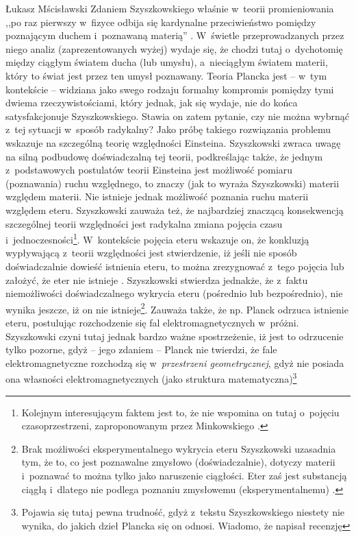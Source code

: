 \begin{artplenv}{Łukasz Mścisławski}
Zdaniem Szyszkowskiego właśnie w~teorii promieniowania ,,po raz pierwszy w~fizyce odbija się kardynalne przeciwieństwo pomiędzy poznającym duchem i~poznawaną materią''
\parencite[][s.~54]{szyszkowski_o_1916}. %
 W~świetle przeprowadzanych przez niego analiz (zaprezentowanych wyżej) wydaje się, że chodzi tutaj o~dychotomię między ciągłym światem ducha (lub umysłu), a~nieciągłym światem materii, który to świat jest przez ten umysł poznawany. Teoria Plancka jest -- w~tym kontekście -- widziana jako swego rodzaju formalny kompromis pomiędzy tymi dwiema rzeczywistościami, który jednak, jak się wydaje, nie do końca satysfakcjonuje Szyszkowskiego. Stawia on zatem pytanie, czy nie można wybrnąć z~tej sytuacji w~sposób radykalny? Jako próbę takiego rozwiązania problemu wskazuje na szczególną teorię względności Einsteina. Szyszkowski zwraca uwagę na silną podbudowę doświadczalną tej teorii, podkreślając także, że jednym z~podstawowych postulatów teorii Einsteina jest możliwość pomiaru (poznawania) ruchu względnego, to znaczy (jak to wyraża Szyszkowski) materii względem materii. Nie istnieje jednak możliwość poznania ruchu materii względem eteru. Szyszkowski zauważa też, że najbardziej znaczącą konsekwencją szczególnej teorii względności jest radykalna zmiana pojęcia czasu i~jednoczesności\footnote{Kolejnym interesującym faktem jest to, że nie wspomina on tutaj o~pojęciu czasoprzestrzeni, zaproponowanym przez Minkowskiego 
\parencite*[][]{minkowski_raum_1909}.%
}. W~kontekście pojęcia eteru wskazuje on, że konkluzją wypływającą z~teorii względności jest stwierdzenie, iż jeśli nie sposób doświadczalnie dowieść istnienia eteru, to można zrezygnować z~tego pojęcia lub założyć, że eter nie istnieje 
\parencite[por.][s.~54–55]{szyszkowski_o_1916}. %
 Szyszkowski stwierdza jednakże, że z~faktu niemożliwości doświadczalnego wykrycia eteru (pośrednio lub bezpośrednio), nie wynika jeszcze, iż on nie istnieje\footnote{Brak możliwości eksperymentalnego wykrycia eteru Szyszkowski uzasadnia tym, że to, co jest poznawalne zmysłowo (doświadczalnie), dotyczy materii i~poznawać to można tylko jako naruszenie ciągłości. Eter zaś jest substancją ciągłą i~dlatego nie podlega poznaniu zmysłowemu (eksperymentalnemu) 
\parencite[][s.~55]{szyszkowski_o_1916}.%
 }. Zauważa także, że np. Planck odrzuca istnienie eteru, postulując rozchodzenie się fal elektromagnetycznych w~próżni. Szyszkowski czyni tutaj jednak bardzo ważne spostrzeżenie, iż jest to odrzucenie tylko pozorne, gdyż -- jego zdaniem -- Planck nie twierdzi, że fale elektromagnetyczne rozchodzą się w~\textit{przestrzeni geometrycznej}, gdyż nie posiada ona własności elektromagnetycznych (jako struktura matematyczna)\footnote{Pojawia się tutaj pewna trudność, gdyż z~tekstu Szyszkowskiego niestety nie wynika, do jakich dzieł Plancka się on odnosi. Wiadomo, że napisał recenzję 
}
\end{artplenv}
